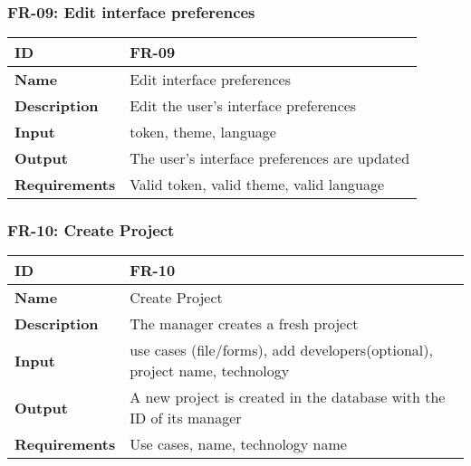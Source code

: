     \subsubsection{FR-09: Edit interface preferences}
    \begin{center}
        \begin{tabularx}{\textwidth}{|l|X|}
            \hline
            \textbf{ID} & FR-09 \\
            \hline
            \textbf{Name} & Edit interface preferences \\
            \hline
            \textbf{Description} & Edit the user's interface preferences \\
            \hline
            \textbf{Input} & token, theme, language \\
            \hline
            \textbf{Output} & The user's interface preferences are updated \\
            \hline
            \textbf{Requirements} & Valid token, valid theme, valid language \\
            \hline
        \end{tabularx}
    \end{center}
    
    

    \subsubsection{FR-10: Create Project}
    \begin{center}
        \begin{tabularx}{\textwidth}{|l|X|}
            \hline
            \textbf{ID} & FR-10 \\
            \hline
            \textbf{Name} & Create Project \\
            \hline
            \textbf{Description} & The manager creates a fresh project \\
            \hline
            \textbf{Input} & use cases (file/forms), add developers(optional), project name, technology \\
            \hline
            \textbf{Output} & A new project is created in the database with the ID of its manager \\
            \hline
            \textbf{Requirements} & Use cases, name, technology name \\
            \hline
        \end{tabularx}
    \end{center}
    
